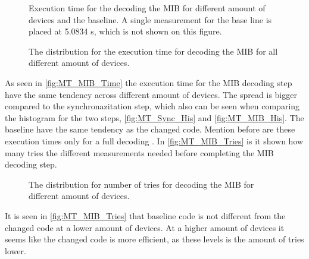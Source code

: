 \captionsetup{belowskip=0em}
\begin{minipage}{0.48\textwidth}
\begin{figure}[H]
\centering
\resizebox{0.9\textwidth}{!}{
}
\caption{Execution time for the decoding the MIB for different amount of devices and the baseline. A single measurement for the base line is placed at 5.0834 s, which is not shown on this figure.}
\label{fig:MT_MIB_Time}
\end{figure}
\end{minipage}%
\hfill
\begin{minipage}{0.48\textwidth}
\begin{figure}[H]
\centering
\resizebox{0.9\textwidth}{!}{
}
\caption{The distribution for the execution time for decoding the MIB for all different amount of devices.}
\label{fig:MT_MIB_His}
\end{figure}
\end{minipage}
\captionsetup{belowskip=-1.5em}

As seen in \autoref{fig:MT_MIB_Time} the execution time for the MIB decoding step have the same tendency across different amount of devices. The spread is bigger compared to the synchronazitation step, which also can be seen when comparing the histogram for the two steps, \autoref{fig:MT_Sync_His} and \autoref{fig:MT_MIB_His}. The baseline have the same tendency as the changed code. Mention before are these execution times only for a full decoding . In \autoref{fig:MT_MIB_Tries} is it shown how many tries the different measurements needed before completing the MIB decoding step.

\begin{figure}[H]
\centering
\resizebox{0.5\textwidth}{!}{
}
\caption{The distribution for number of tries for decoding the MIB for different amount of devices.}
\label{fig:MT_MIB_Tries}
\end{figure}

It is seen in \autoref{fig:MT_MIB_Tries} that baseline code is not different from the changed code at a lower amount of devices. At a higher amount of devices it seems like the changed code is more efficient, as these levels is the amount of tries lower. 

